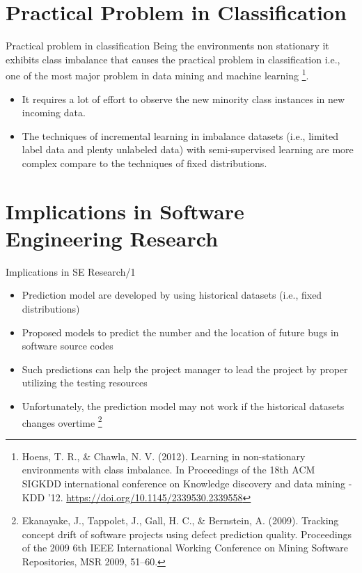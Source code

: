 \documentclass[10pt]{beamer}
\begin{document}
\section{Practical Problem in Classification}
\begin{frame}{Practical problem in classification}
Being the environments non stationary it exhibits class imbalance that causes the practical problem in classification i.e., one of the most major problem in data mining and machine learning \footnote{Hoens, T. R., \& Chawla, N. V. (2012). Learning in non-stationary environments with class imbalance. In Proceedings of the 18th ACM SIGKDD international conference on Knowledge discovery and data mining - KDD ’12. \url{https://doi.org/10.1145/2339530.2339558}}.
\begin{itemize}
    \item It requires a lot of effort to observe the new minority class instances in new incoming data.
    \item The techniques of incremental learning in imbalance datasets (i.e., limited label data and plenty unlabeled data) with semi-supervised learning are more complex compare to the techniques of fixed distributions.
\end{itemize}
    
\end{frame}
\section{Implications in Software Engineering Research}
\begin{frame}{Implications in SE Research/1}
\begin{itemize}
    \item Prediction model are developed by using historical datasets (i.e., fixed distributions) 
    \item Proposed models to predict the number and the location of future bugs in software source codes
    \item Such predictions can help the project manager to lead the project by proper utilizing the testing resources
    \item Unfortunately, the prediction model may not work if the historical datasets changes overtime \footnote{Ekanayake, J., Tappolet, J., Gall, H. C., \& Bernstein, A. (2009). Tracking concept drift of software projects using defect prediction quality. Proceedings of the 2009 6th IEEE International Working Conference on Mining Software Repositories, MSR 2009, 51–60.}
\end{itemize}
\end{frame}
\end{document}
